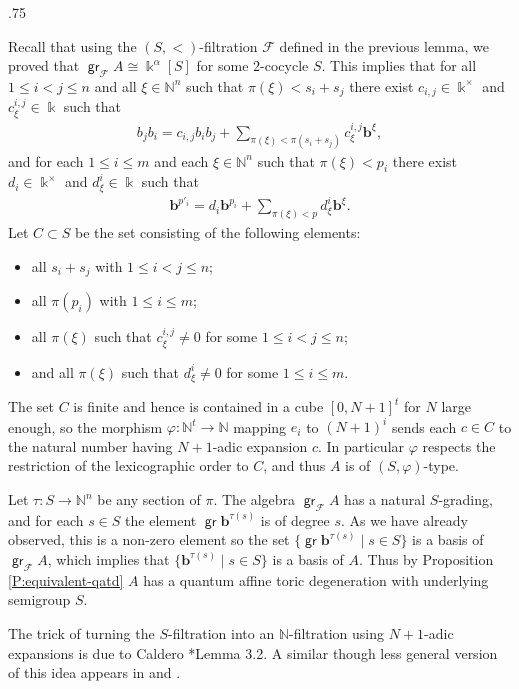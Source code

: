 \documentclass[11pt,fleqn]{article}
\makeatletter
\renewenvironment{proof}[1][\textit{Proof}]{\par
  \pushQED{\qed}%
  \normalfont \topsep.75\paraskip\relax
  \trivlist
  \item[\hskip\labelsep
        \itshape
    #1\@addpunct{.}]\ignorespaces
}{%
  \popQED\endtrivlist\@endpefalse
}
\newcommand\NN{\mathbb N}
\renewcommand\to{\longrightarrow}
\renewcommand\phi{\varphi}
\newcommand\F{\mathcal F}
\renewcommand\b{\mathbf b}
\renewcommand\k{\Bbbk}
\DeclareMathOperator\gr{\mathsf{gr}}
\makeatother
\begin{document}
\begin{proof}
Recall that using the $(S,<)$-filtration $\F$ defined in the previous lemma, 
we proved that $\gr_\F A \cong \k^\alpha[S]$ for some $2$-cocycle $S$. This 
implies that for all $1 \leq i < j \leq n$ and all $\xi \in \NN^n$ such that 
$\pi(\xi) < s_i +s_j$ there exist $c_{i,j} \in \k^\times$ and $c^{i,j}_\xi 
\in \k$ such that
\begin{align*}
b_j b_i 
  = c_{i,j} b_i b_j 
    + \sum_{\pi(\xi) < \pi(s_i + s_j)} c^{i,j}_\xi \b^\xi,
\end{align*}
and for each $1 \leq i \leq m$ and each $\xi \in \NN^n$ such that $\pi(\xi) < 
p_i$ there exist $d_i \in \k^\times$ and $d^i_\xi \in \k$ such that
\begin{align*}
  \b^{p'_i} = d_i \b^{p_i} + \sum_{\pi(\xi) < p} d^i_\xi \b^\xi.
\end{align*}
Let $C \subset S$ be the set consisting of the following elements:
\begin{itemize}
\item all $s_i + s_j$ with $1 \leq i<j\leq n$;
\item all $\pi(p_i)$ with $1 \leq i \leq m$;
\item all $\pi(\xi)$ such that $c^{i,j}_\xi \neq 0$ for some $1 \leq i < j 
  \leq n$;
\item and all $\pi(\xi)$ such that $d^i_\xi \neq 0$ for some $1 \leq i \leq m$.
\end{itemize}  
The set $C$ is finite and hence is contained in a cube $[0,N+1]^t$ for $N$ 
large enough, so the morphism $\phi: \NN^t \to \NN$ mapping $e_i$ to $(N+1)^i$ 
sends each $c \in C$ to the natural number having $N+1$-adic expansion $c$. In 
particular $\phi$ respects the restriction of the lexicographic order to $C$, 
and thus $A$ is of $(S,\phi)$-type. 

Let $\tau: S \to \NN^n$ be any section of $\pi$. The algebra $\gr_\F A$ has a 
natural $S$-grading, and for each $s \in S$ the element $\gr \b^{\tau(s)}$ is 
of degree $s$. As we have already observed, this is a non-zero element so the 
set $\{\gr \b^{\tau(s)} \mid s \in S\}$ is a basis of $\gr_\F A$, which 
implies that $\{\b^{\tau(s)} \mid s \in S\}$ is a basis of $A$. Thus by 
Proposition \ref{P:equivalent-qatd} $A$ has a quantum affine toric 
degeneration with underlying semigroup $S$.
\end{proof}

\begin{Remark*}
The trick of turning the $S$-filtration into an $\NN$-filtration using 
$N+1$-adic expansions is due to Caldero \cite{C}*{Lemma 3.2}. A similar though 
less general version of this idea appears in \cite{GL} and \cite{RZ}.
\end{Remark*}
\end{document}
